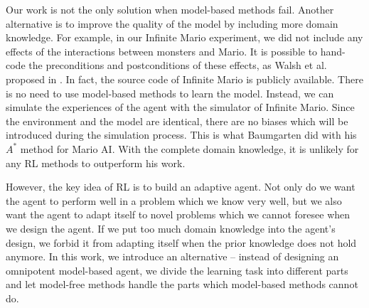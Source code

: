 Our work is not the only solution when model-based methods fail.
Another alternative is to improve the quality of the model by including more domain knowledge.
For example, in our Infinite Mario experiment, we did not include any effects 
of the interactions between monsters and Mario. It is possible to
hand-code the preconditions and postconditions of these effects, as Walsh et al. proposed in \cite{Walsh09}.
In fact, the source code of Infinite Mario is publicly available.
There is no need to use model-based methods to learn the model. Instead,
we can simulate the experiences of the agent with the simulator of Infinite Mario. 
Since the environment and the model are identical, there are no biases which will be 
introduced during the simulation process.
This is what Baumgarten did with his $A^*$ method for Mario AI\cite{Robin09}.
With the complete domain knowledge, it is unlikely for any RL methods to outperform his work.


However, the key idea of RL is to build an adaptive agent.
Not only do we want the agent to perform well in a problem which we know very well,
but we also want the agent to adapt itself to novel problems which we cannot foresee when we design the agent.
If we put too much domain knowledge into the agent's design, we forbid it from adapting 
itself when the prior knowledge does not hold anymore. 
In this work, we introduce an alternative -- instead of designing an omnipotent model-based agent, we
divide the learning task into different parts and let model-free methods handle the parts which model-based methods cannot do.




